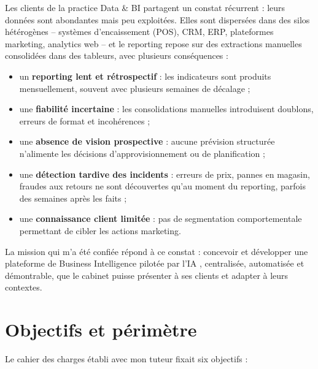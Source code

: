 \documentclass[12pt,a4paper]{report}
\begin{document}
Les clients de la practice Data \& BI partagent un constat récurrent : leurs
données sont abondantes mais peu exploitées. Elles sont dispersées dans des
silos hétérogènes -- systèmes d'encaissement (POS), CRM, ERP, plateformes
marketing, analytics web -- et le reporting repose sur des extractions
manuelles consolidées dans des tableurs, avec plusieurs conséquences :

\begin{itemize}
  \item un \textbf{reporting lent et rétrospectif} : les indicateurs sont
    produits mensuellement, souvent avec plusieurs semaines de décalage ;
  \item une \textbf{fiabilité incertaine} : les consolidations manuelles
    introduisent doublons, erreurs de format et incohérences ;
  \item une \textbf{absence de vision prospective} : aucune prévision
    structurée n'alimente les décisions d'approvisionnement ou de
    planification ;
  \item une \textbf{détection tardive des incidents} : erreurs de prix, pannes
    en magasin, fraudes aux retours ne sont découvertes qu'au moment du
    reporting, parfois des semaines après les faits ;
  \item une \textbf{connaissance client limitée} : pas de segmentation
    comportementale permettant de cibler les actions marketing.
\end{itemize}

La mission qui m'a été confiée répond à ce constat : concevoir et développer
une plateforme de Business Intelligence \og pilotée par l'IA \fg{},
centralisée, automatisée et démontrable, que le cabinet puisse présenter à ses
clients et adapter à leurs contextes.

\section{Objectifs et périmètre}

Le cahier des charges établi avec mon tuteur fixait six objectifs :
\end{document}
